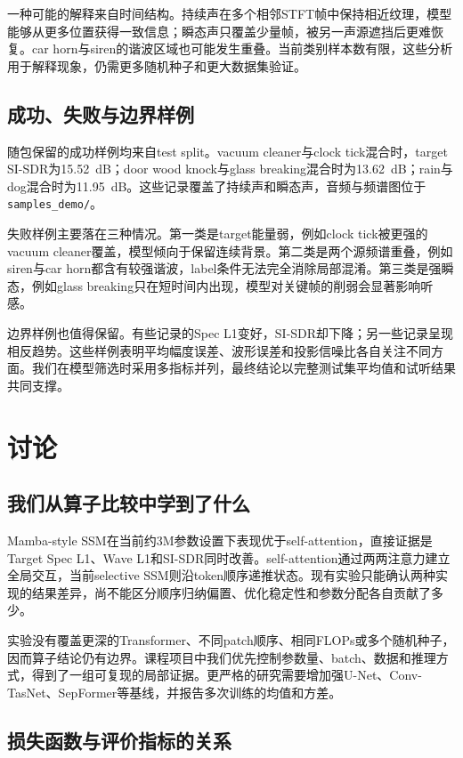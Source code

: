 \documentclass[UTF8,12pt,a4paper]{ctexart}
\newcommand{\code}[1]{\texttt{#1}}
\begin{document}
一种可能的解释来自时间结构。持续声在多个相邻STFT帧中保持相近纹理，模型能够从更多位置获得一致信息；瞬态声只覆盖少量帧，被另一声源遮挡后更难恢复。car horn与siren的谐波区域也可能发生重叠。当前类别样本数有限，这些分析用于解释现象，仍需更多随机种子和更大数据集验证。

\subsection{成功、失败与边界样例}

随包保留的成功样例均来自test split。vacuum cleaner与clock tick混合时，target SI-SDR为15.52~dB；door wood knock与glass breaking混合时为13.62~dB；rain与dog混合时为11.95~dB。这些记录覆盖了持续声和瞬态声，音频与频谱图位于\code{samples\_demo/}。

失败样例主要落在三种情况。第一类是target能量弱，例如clock tick被更强的vacuum cleaner覆盖，模型倾向于保留连续背景。第二类是两个源频谱重叠，例如siren与car horn都含有较强谐波，label条件无法完全消除局部混淆。第三类是强瞬态，例如glass breaking只在短时间内出现，模型对关键帧的削弱会显著影响听感。

边界样例也值得保留。有些记录的Spec L1变好，SI-SDR却下降；另一些记录呈现相反趋势。这些样例表明平均幅度误差、波形误差和投影信噪比各自关注不同方面。我们在模型筛选时采用多指标并列，最终结论以完整测试集平均值和试听结果共同支撑。

\section{讨论}

\subsection{我们从算子比较中学到了什么}

Mamba-style SSM在当前约3M参数设置下表现优于self-attention，直接证据是Target Spec L1、Wave L1和SI-SDR同时改善。self-attention通过两两注意力建立全局交互，当前selective SSM则沿token顺序递推状态。现有实验只能确认两种实现的结果差异，尚不能区分顺序归纳偏置、优化稳定性和参数分配各自贡献了多少。

实验没有覆盖更深的Transformer、不同patch顺序、相同FLOPs或多个随机种子，因而算子结论仍有边界。课程项目中我们优先控制参数量、batch、数据和推理方式，得到了一组可复现的局部证据。更严格的研究需要增加强U-Net、Conv-TasNet、SepFormer等基线，并报告多次训练的均值和方差。

\subsection{损失函数与评价指标的关系}
\end{document}

